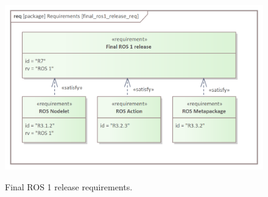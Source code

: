 \begin{figure}[H]
	\centering
	\begin{center}
	{\includegraphics[scale=1.1]{../imgs/requirement_pkg/final_ros1_release_req.png}}
	\end{center}
	\caption{Final ROS 1 release requirements.}
	\label{fig:final_ros1_release_req}
\end{figure}
